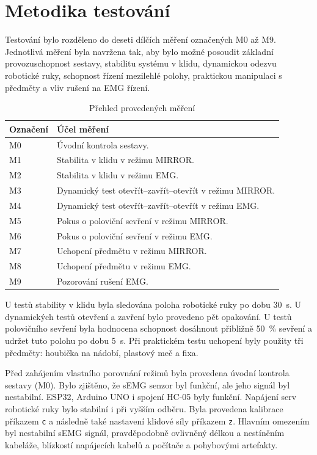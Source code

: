 \documentclass[FZS,DP]{tulthesis}
\begin{document}
\section{Metodika testování}
\label{sec:metodika-testovani}

Testování bylo rozděleno do deseti dílčích měření označených M0 až M9. Jednotlivá měření byla navržena tak, aby bylo možné posoudit základní provozuschopnost sestavy, stabilitu systému v klidu, dynamickou odezvu robotické ruky, schopnost řízení mezilehlé polohy, praktickou manipulaci s předměty a vliv rušení na EMG řízení.

\begin{table}[H]
\centering
\caption{Přehled provedených měření}
\label{tab:prehled-mereni}
\begin{tabular}{|p{}|p{}|}
\hline
\textbf{Označení} & \textbf{Účel měření} \\
\hline
M0 & Úvodní kontrola sestavy. \\
\hline
M1 & Stabilita v klidu v režimu MIRROR\@. \\
\hline
M2 & Stabilita v klidu v režimu EMG\@. \\
\hline
M3 & Dynamický test otevřít--zavřít--otevřít v režimu MIRROR\@. \\
\hline
M4 & Dynamický test otevřít--zavřít--otevřít v režimu EMG\@. \\
\hline
M5 & Pokus o poloviční sevření v režimu MIRROR\@. \\
\hline
M6 & Pokus o poloviční sevření v režimu EMG\@. \\
\hline
M7 & Uchopení předmětu v režimu MIRROR\@. \\
\hline
M8 & Uchopení předmětu v režimu EMG\@. \\
\hline
M9 & Pozorování rušení EMG\@. \\
\hline
\end{tabular}
\end{table}

U testů stability v klidu byla sledována poloha robotické ruky po dobu 30~s. U dynamických testů otevření a zavření bylo provedeno pět opakování. U testů polovičního sevření byla hodnocena schopnost dosáhnout přibližně 50~\% sevření a udržet tuto polohu po dobu 5~s. Při praktickém testu uchopení byly použity tři předměty: houbička na nádobí, plastový meč a fixa.

Před zahájením vlastního porovnání režimů byla provedena úvodní kontrola sestavy (M0). Bylo zjištěno, že sEMG senzor byl funkční, ale jeho signál byl nestabilní. ESP32, Arduino UNO i spojení HC-05 byly funkční. Napájení serv robotické ruky bylo stabilní i při vyšším odběru. Byla provedena kalibrace příkazem \texttt{c} a následně také nastavení klidové síly příkazem \texttt{z}. Hlavním omezením byl nestabilní sEMG signál, pravděpodobně ovlivněný délkou a nestíněním kabeláže, blízkostí napájecích kabelů a počítače a pohybovými artefakty.
\end{document}
